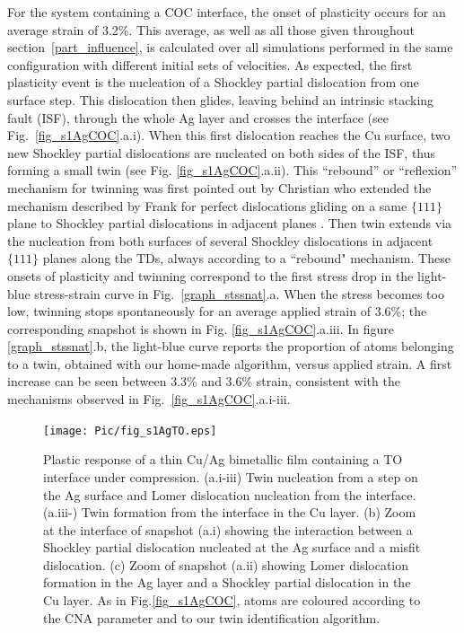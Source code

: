 \documentclass[final,3p,times,twocolumn]{elsarticle}
\begin{document}
For the system containing a COC interface, the onset of plasticity occurs for an average strain of 3.2\%. This average, as well as all those given throughout section~\ref{part_influence}, is calculated  over all simulations performed in the same configuration with different initial sets of velocities. As expected, the first plasticity event is the nucleation of a Shockley partial dislocation from one surface step. This dislocation then glides, leaving behind an intrinsic stacking fault (ISF), through the whole Ag layer and crosses the interface (see Fig.~\ref{fig_s1AgCOC}.a.i). When this first dislocation reaches the Cu surface, two new Shockley partial dislocations are nucleated on both sides of the ISF, thus forming a small twin (see Fig. \ref{fig_s1AgCOC}.a.ii). This ``rebound'' or ``reflexion'' mechanism for twinning was first pointed out by Christian who extended the mechanism described by Frank for perfect dislocations gliding on a same $\lbrace111\rbrace$ plane \cite{hirth82book} to Shockley partial dislocations in adjacent planes \cite{christian51PRS}. Then twin extends via the nucleation from both surfaces of several Shockley dislocations in adjacent $\lbrace111\rbrace$  planes along the TDs, always according to a ``rebound" mechanism. These onsets of plasticity and twinning correspond to the first stress drop in the light-blue stress-strain curve in Fig.~\ref{graph_stssnat}.a. When the stress becomes too low, twinning stops spontaneously for an average applied strain of 3.6\%; the corresponding snapshot is shown in Fig. \ref{fig_s1AgCOC}.a.iii. In figure \ref{graph_stssnat}.b, the light-blue curve reports the proportion of atoms belonging to a twin, obtained with our home-made algorithm, versus applied strain. A first increase can be seen between 3.3\% and 3.6\% strain, consistent with the mechanisms observed in Fig.~\ref{fig_s1AgCOC}.a.i-iii. 

\begin{figure}[!t]
	\begin{center}
		\texttt{[image: Pic/fig\_s1AgTO.eps]} 
	\end{center}
	\caption{Plastic response of a thin Cu/Ag bimetallic film containing a TO interface under compression. (a.i-iii) Twin nucleation from a step on the Ag surface and Lomer dislocation nucleation from the interface. (a.iii-) Twin formation from the interface in the Cu layer. (b) Zoom at the interface of snapshot (a.i) showing the interaction between a Shockley partial dislocation nucleated at the Ag surface and a misfit dislocation. (c) Zoom of snapshot (a.ii) showing Lomer dislocation formation in the Ag layer and a Shockley partial dislocation in the Cu layer. As in Fig.\ref{fig_s1AgCOC}, atoms are coloured according to the CNA parameter and to our twin identification algorithm.}\label{fig_s1AgTO}
\end{figure}
\end{document}
